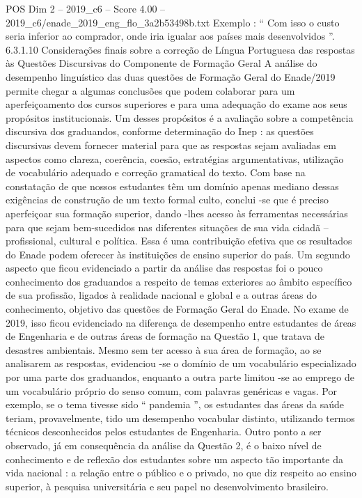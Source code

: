 \begin{textsample}{POS Dim 2 – 2019\_c6 – Score 4.00 – 2019\_c6/enade\_2019\_eng\_flo\_3a2b53498b.txt}
Exemplo : “ Com isso o custo seria inferior ao comprador, onde iria igualar aos países mais desenvolvidos ”. 6.3.1.10 Considerações finais sobre a correção de Língua Portuguesa das respostas às Questões Discursivas do Componente de Formação Geral A análise do desempenho linguístico das duas questões de Formação Geral do Enade/2019 permite chegar a algumas conclusões que podem colaborar para um aperfeiçoamento dos cursos superiores e para uma adequação do exame aos seus propósitos institucionais.
Um desses propósitos é a avaliação sobre a competência discursiva dos graduandos, conforme determinação do Inep : as questões discursivas devem fornecer material para que as respostas sejam avaliadas em aspectos como clareza, coerência, coesão, estratégias argumentativas, utilização de vocabulário adequado e correção gramatical do texto.
Com base na constatação de que nossos estudantes têm um domínio apenas mediano dessas exigências de construção de um texto formal culto, conclui -se que é preciso aperfeiçoar sua formação superior, dando -lhes acesso às ferramentas necessárias para que sejam bem-sucedidos nas diferentes situações de sua vida cidadã – profissional, cultural e política.
Essa é uma contribuição efetiva que os resultados do Enade podem oferecer às instituições de ensino superior do país.
Um segundo aspecto que ficou evidenciado a partir da análise das respostas foi o pouco conhecimento dos graduandos a respeito de temas exteriores ao âmbito específico de sua profissão, ligados à realidade nacional e global e a outras áreas do conhecimento, objetivo das questões de Formação Geral do Enade.
No exame de 2019, isso ficou evidenciado na diferença de desempenho entre estudantes de áreas de Engenharia e de outras áreas de formação na Questão 1, que tratava de desastres ambientais.
Mesmo sem ter acesso à sua área de formação, ao se analisarem as respostas, evidenciou -se o domínio de um vocabulário especializado por uma parte dos graduandos, enquanto a outra parte limitou -se ao emprego de um vocabulário próprio do senso comum, com palavras genéricas e vagas.
Por exemplo, se o tema tivesse sido “ pandemia ”, os estudantes das áreas da saúde teriam, provavelmente, tido um desempenho vocabular distinto, utilizando termos técnicos desconhecidos pelos estudantes de Engenharia.
Outro ponto a ser observado, já em consequência da análise da Questão 2, é o baixo nível de conhecimento e de reflexão dos estudantes sobre um aspecto tão importante da vida nacional : a relação entre o público e o privado, no que diz respeito ao ensino superior, à pesquisa universitária e seu papel no desenvolvimento brasileiro.

\end{textsample}

